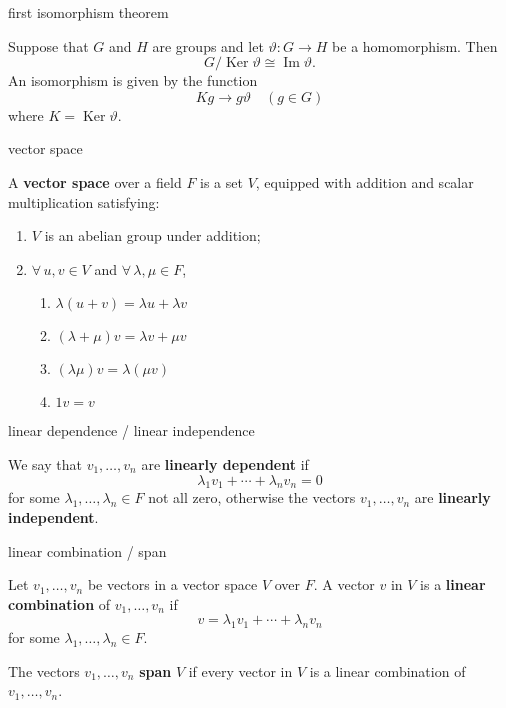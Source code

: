 \documentclass[avery5371,grid]{flashcards}
\renewcommand{\theta}{\vartheta}
\newcommand{\iso}{\cong}
\DeclareMathOperator{\Ker}{\ensuremath{\textrm{Ker}}}
\DeclareMathOperator{\Img}{\ensuremath{\textrm{Im}}}
\newcommand{\defn}[1]{\textbf{#1}}
\begin{document}
\begin{flashcard}[Theorem 1.10]{first isomorphism theorem}

  Suppose that $G$ and $H$ are groups and let $\theta: G \to H$ be a
  homomorphism. Then
  \[
    G / \Ker \theta \iso \Img \theta.
  \]
  An isomorphism is given by the function
  \[
    Kg \to g\theta \quad (g \in G)
  \]
  where $K = \Ker \theta$.
\end{flashcard}

\begin{flashcard}[Definition]{vector space}

  A \defn{vector space} over a field $F$ is a set $V$, equipped with
  addition and scalar multiplication satisfying:
  \begin{enumerate}
  \item $V$ is an abelian group under addition;
  \item $\forall \, u,v \in V$ and $\forall \, \lambda, \mu \in F$,
    \begin{enumerate}
    \item $\lambda(u + v) = \lambda u + \lambda v$
    \item $(\lambda + \mu)v = \lambda v + \mu v$
    \item $(\lambda \mu) v = \lambda (\mu v)$
    \item $1 v = v$
    \end{enumerate}
  \end{enumerate}

\end{flashcard}

\begin{flashcard}[Definition]{linear dependence / linear independence}

  We say that $v_1, \ldots, v_n$ are \defn{linearly dependent} if
  \[
    \lambda_1 v_1 + \cdots + \lambda_n v_n = 0
  \]
  for some $\lambda_1, \ldots, \lambda_n \in F$ not all zero,
  otherwise the vectors $v_1, \ldots, v_n$ are \defn{linearly
    independent}. 
\end{flashcard}

\begin{flashcard}[Definition]{linear combination / span}

  Let $v_1, \ldots, v_n$ be vectors in a vector space $V$ over $F$. A
  vector $v$ in $V$ is a \defn{linear combination} of
  $v_1, \ldots, v_n$ if
  \[
    v = \lambda_1 v_1 + \cdots + \lambda_n v_n
  \]
  for some $\lambda_1, \ldots, \lambda_n \in F$.
  \vfill

  The vectors $v_1, \ldots, v_n$ \defn{span} $V$ if every vector in
  $V$ is a linear combination of $v_1, \ldots, v_n$.

\end{flashcard}
\end{document}
